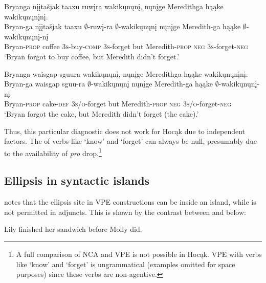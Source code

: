 \documentclass[output=paper]{LSP/langsci}
\begin{document}
 
\ea\label{ex:johnson:33}
\ea\label{ex:johnson:33a} 
\glll Bryanga {nįįtašjak taaxu} ruwįra wakikųnųnį, nųnįge Meredithga hąąke wakikųnųnįnį.\\
Bryan-ga {nįįtašjak taaxu} $\emptyset$-ruwį-ra $\emptyset$-wakikųnųnį nųnįge Meredith-ga hąąke $\emptyset$-wakikųnųnį-nį\\
Bryan-\textsc{prop} coffee \textsc{3s}-buy-\textsc{comp} \textsc{3s}-forget but Meredith-\textsc{prop} \textsc{neg} \textsc{3s}-forget-\textsc{neg}\\
\trans `Bryan forgot to buy coffee, but Meredith didn't forget.'
 
\ex\label{ex:johnson:33b} 
\glll Bryanga {waisgap sguura} wakikųnųnį, nųnįge Meredithga hąąke wakikųnųnįnį.\\
Bryan-ga {waisgap sguu-ra} $\emptyset$-wakikųnųnį nųnįge Meredith-ga hąąke $\emptyset$-wakikųnųnį-nį\\
Bryan-\textsc{prop} cake-\textsc{def} \textsc{3s/o}-forget but Meredith-\textsc{prop} \textsc{neg} \textsc{3s/o}-forget-\textsc{neg}\\
\trans `Bryan forgot the cake, but Meredith didn't forget (the cake).'
\z
\z

\newpage
 
Thus, this particular diagnostic does not work for Hocąk due to independent factors. The  of verbs like `know' and `forget' can always be null, presumably due to the availability of  \emph{pro} drop.\footnote{A full comparison of NCA and VPE is not possible in Hocąk. VPE with verbs like `know' and `forget' is ungrammatical (examples omitted for space purposes) since these verbs are non-agentive.}
 

\subsection{Ellipsis in syntactic islands}\label{sec:johnson:3.3}

\citet{Goldberg2005} notes that the ellipsis site in VPE constructions can be inside an  island, while  is not permitted in adjuncts. This is shown by the contrast between  and  below:
 
\ea
\ea\label{ex:johnson:34a} 
Lily finished her sandwich before Molly did.
\label{ex:johnson:34b}
\z
\z
\end{document}
